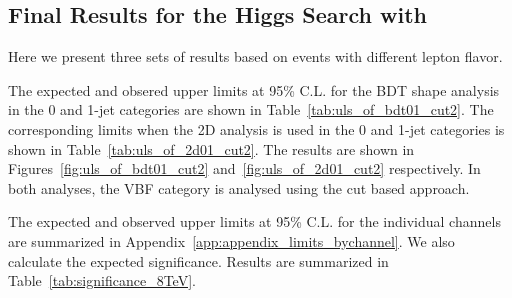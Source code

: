 \clearpage
\subsection{Final Results for the Higgs Search with \intlumiEightTeV{}}
\label{sec:search_results}

Here we present three sets of results based on events with
different lepton flavor. 

The expected and obsered upper limits at 95\% C.L.
for the BDT shape analysis in the 0 and 1-jet categories
are shown in Table~\ref{tab:uls_of_bdt01_cut2}.
The corresponding limits when the 2D analysis is used 
in the 0 and 1-jet categories is shown in Table~\ref{tab:uls_of_2d01_cut2}.
The results are shown in Figures~\ref{fig:uls_of_bdt01_cut2} 
and~\ref{fig:uls_of_2d01_cut2} respectively.
In both analyses, the VBF category is analysed using the cut based approach.

The expected and observed upper limits at 95\% C.L. for the individual channels 
are summarized in Appendix~\ref{app:appendix_limits_bychannel}. 
We also calculate the expected significance.
Results are summarized in Table~\ref{tab:significance_8TeV}.


